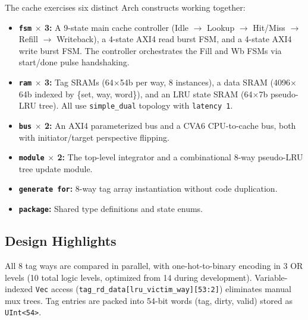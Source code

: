 \documentclass[11pt,twocolumn]{article}
\begin{document}
The cache exercises six distinct Arch constructs working together:

\begin{itemize}
\item \textbf{\texttt{fsm} $\times$ 3:} A 9-state main cache controller (Idle $\to$ Lookup $\to$ Hit/Miss $\to$ Refill $\to$ Writeback), a 4-state AXI4 read burst FSM, and a 4-state AXI4 write burst FSM. The controller orchestrates the Fill and Wb FSMs via start/done pulse handshaking.
\item \textbf{\texttt{ram} $\times$ 3:} Tag SRAMs (64$\times$54b per way, 8 instances), a data SRAM (4096$\times$64b indexed by \{set, way, word\}), and an LRU state SRAM (64$\times$7b pseudo-LRU tree). All use \texttt{simple\_dual} topology with \texttt{latency 1}.
\item \textbf{\texttt{bus} $\times$ 2:} An AXI4 parameterized bus and a CVA6 CPU-to-cache bus, both with initiator/target perspective flipping.
\item \textbf{\texttt{module} $\times$ 2:} The top-level integrator and a combinational 8-way pseudo-LRU tree update module.
\item \textbf{\texttt{generate for}:} 8-way tag array instantiation without code duplication.
\item \textbf{\texttt{package}:} Shared type definitions and state enums.
\end{itemize}

\subsection{Design Highlights}

All 8 tag ways are compared in parallel, with one-hot-to-binary encoding in 3 OR levels (10 total logic levels, optimized from 14 during development). Variable-indexed \texttt{Vec} access (\texttt{tag\_rd\_data[lru\_victim\_way][53:2]}) eliminates manual mux trees. Tag entries are packed into 54-bit words (tag, dirty, valid) stored as \texttt{UInt<54>}.
\end{document}
